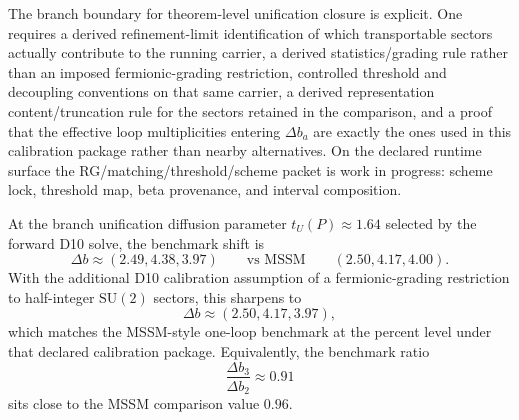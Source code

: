 The branch boundary for theorem-level unification closure is explicit. One requires a derived
refinement-limit identification of which transportable sectors actually contribute to the running
carrier, a derived statistics/grading rule rather than an imposed fermionic-grading restriction,
controlled threshold and decoupling conventions on that same carrier, a derived representation
content/truncation rule for the sectors retained in the comparison, and a proof that the effective
loop multiplicities entering \(\Delta b_a\) are exactly the ones used in this calibration package
rather than nearby alternatives. On the declared runtime surface the
RG/matching/threshold/scheme packet is work in progress: scheme lock, threshold map,
beta provenance, and interval composition.

At the branch unification diffusion parameter \(t_U(P)\approx 1.64\) selected by the forward D10
solve, the benchmark shift is
\[
\Delta b\approx (2.49,4.38,3.97)
\qquad
\text{vs MSSM}
\qquad
(2.50,4.17,4.00).
\]
With the additional D10 calibration assumption of a fermionic-grading restriction to
half-integer \(\mathrm{SU}(2)\) sectors, this sharpens to
\[
\Delta b\approx (2.50,4.17,3.97),
\]
which matches the MSSM-style one-loop benchmark at the percent level under that declared
calibration package. Equivalently, the benchmark ratio
\[
\frac{\Delta b_3}{\Delta b_2}\approx 0.91
\]
sits close to the MSSM comparison value \(0.96\).
